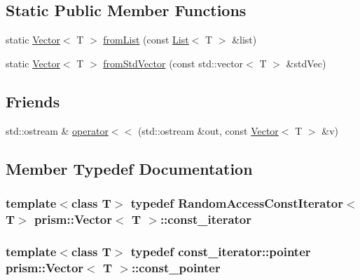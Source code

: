 \subsection*{Static Public Member Functions}
\begin{DoxyCompactItemize}
\item 
static \hyperlink{classprism_1_1_vector}{Vector}$<$ T $>$ \hyperlink{classprism_1_1_vector_a66de66a61b4577aa20f6a6f5e4b8e99d}{from\+List} (const \hyperlink{classprism_1_1_list}{List}$<$ T $>$ \&list)
\item 
static \hyperlink{classprism_1_1_vector}{Vector}$<$ T $>$ \hyperlink{classprism_1_1_vector_ac947685add7d54b025a471b59445fc6a}{from\+Std\+Vector} (const std\+::vector$<$ T $>$ \&std\+Vec)
\end{DoxyCompactItemize}
\subsection*{Friends}
\begin{DoxyCompactItemize}
\item 
std\+::ostream \& \hyperlink{classprism_1_1_vector_adea1a7e2e26629669d11a49d8899a1ec}{operator$<$$<$} (std\+::ostream \&out, const \hyperlink{classprism_1_1_vector}{Vector}$<$ T $>$ \&v)
\end{DoxyCompactItemize}


\subsection{Member Typedef Documentation}
\subsubsection[{\texorpdfstring{const\+\_\+iterator}{const_iterator}}]{\setlength{\rightskip}{0pt plus 5cm}template$<$class T$>$ typedef Random\+Access\+Const\+Iterator$<$T$>$ {\bf prism\+::\+Vector}$<$ T $>$\+::{\bf const\+\_\+iterator}}\hypertarget{classprism_1_1_vector_acc6ed07e2d7ed5065feec92a83e46fa4}{}\label{classprism_1_1_vector_acc6ed07e2d7ed5065feec92a83e46fa4}
\subsubsection[{\texorpdfstring{const\+\_\+pointer}{const_pointer}}]{\setlength{\rightskip}{0pt plus 5cm}template$<$class T$>$ typedef const\+\_\+iterator\+::pointer {\bf prism\+::\+Vector}$<$ T $>$\+::{\bf const\+\_\+pointer}}\hypertarget{classprism_1_1_vector_a0bf16322f83f0ad9103815a1cac16156}{}\label{classprism_1_1_vector_a0bf16322f83f0ad9103815a1cac16156}
